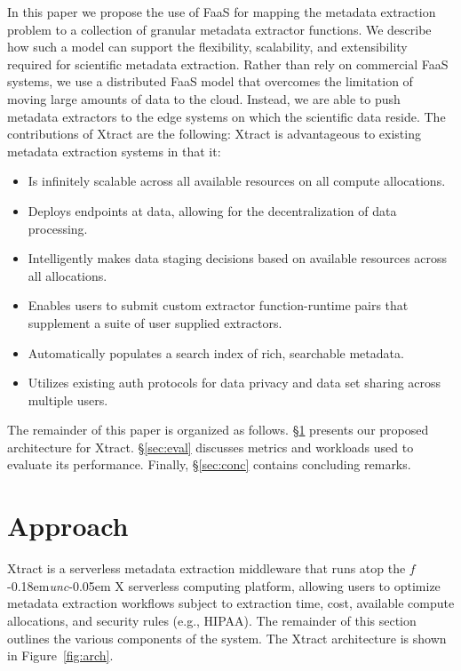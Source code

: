 \documentclass[sigconf, 9pt]{acmart}
\newcommand{\tyler}[1]{}
\newcommand{\tyler}[1]{{\textcolor{cyan}{ tyler: #1 }}}
\newcommand{\name}{Xtract}
\newcommand{\funcx}{$f$\kern-0.18em\emph{unc}\kern-0.05em X}
\begin{document}
\tyler{unplagiarize the first 3 sentences here}
In this paper we propose the use of FaaS for mapping the metadata extraction problem to a 
collection of granular metadata extractor functions. 
We describe how such a model can support the flexibility, scalability, and extensibility required
for scientific metadata extraction. 
Rather than rely on commercial FaaS systems, we use a distributed FaaS model 
that overcomes the limitation of moving large amounts of data to the cloud. 
Instead, we are able to push
metadata extractors to the edge systems on which the scientific data reside. 
The contributions of \name{} are the following: 
\name{} is advantageous to existing metadata extraction 
systems in that it: 
\begin{itemize}
\item Is infinitely scalable across all available resources on all compute allocations. 
\item Deploys endpoints at data, allowing for the decentralization of data processing. 
\item Intelligently makes data staging decisions based on available resources across all allocations.
\item Enables users to submit custom extractor function-runtime pairs that supplement a suite of user supplied extractors.
\item Automatically populates a search index of rich, searchable metadata. 
\item Utilizes existing auth protocols for data privacy and data set sharing across multiple users. 
\end{itemize}


The remainder of this paper is organized as follows. 
\S\ref{sec:approach} presents our proposed architecture for \name{}. 
\S\ref{sec:eval} discusses metrics and workloads used to evaluate its performance. 
Finally, \S\ref{sec:conc} contains concluding remarks.


\section{Approach}
\label{sec:approach}

\name{} is a serverless metadata extraction middleware that runs atop the \funcx{} serverless 
computing platform, allowing users to optimize metadata extraction workflows subject to 
extraction time, cost, available compute allocations, and security rules (e.g., HIPAA). The remainder 
of this section outlines the various components of the system. The \name{} architecture is shown in Figure~\ref{fig:arch}.
\end{document}
